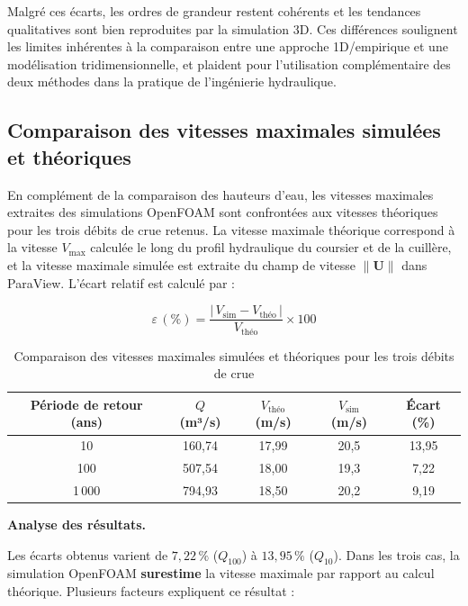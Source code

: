 \medskip
Malgré ces écarts, les ordres de grandeur restent cohérents et les tendances qualitatives sont bien reproduites par la simulation 3D. Ces différences soulignent les limites inhérentes à la comparaison entre une approche 1D/empirique et une modélisation tridimensionnelle, et plaident pour l'utilisation complémentaire des deux méthodes dans la pratique de l'ingénierie hydraulique.

\subsection{Comparaison des vitesses maximales simulées et théoriques}
\label{subsec:comparaison_vitesses}

En complément de la comparaison des hauteurs d'eau, les vitesses maximales extraites des simulations OpenFOAM sont confrontées aux vitesses théoriques pour les trois débits de crue retenus. La vitesse maximale théorique correspond à la vitesse $V_{\max}$ calculée le long du profil hydraulique du coursier et de la cuillère, et la vitesse maximale simulée est extraite du champ de vitesse $\|\mathbf{U}\|$ dans ParaView. L'écart relatif est calculé par :

\begin{equation}
    \varepsilon\,(\%) = \frac{|\,V_{\text{sim}} - V_{\text{théo}}\,|}{V_{\text{théo}}} \times 100
\end{equation}

\begin{table}[H]
\centering
\caption{Comparaison des vitesses maximales simulées et théoriques pour les trois débits de crue}
\label{tab:comparaison_vitesses}
\renewcommand{\arraystretch}{1.4}
\begin{tabular}{ccccc}
\toprule
\textbf{Période de retour (ans)} & \textbf{$Q$ (m³/s)} & \textbf{$V_{\text{théo}}$ (m/s)} & \textbf{$V_{\text{sim}}$ (m/s)} & \textbf{Écart (\%)} \\
\midrule
10    & 160,74 & 17,99 & 20,5 & 13,95 \\
100   & 507,54 & 18,00 & 19,3 &  7,22 \\
1\,000 & 794,93 & 18,50 & 20,2 &  9,19 \\
\bottomrule
\end{tabular}
\end{table}

\medskip
\noindent\textbf{Analyse des résultats.}

\medskip
Les écarts obtenus varient de $7{,}22\,\%$ ($Q_{100}$) à $13{,}95\,\%$ ($Q_{10}$). Dans les trois cas, la simulation OpenFOAM \textbf{surestime} la vitesse maximale par rapport au calcul théorique. Plusieurs facteurs expliquent ce résultat :

